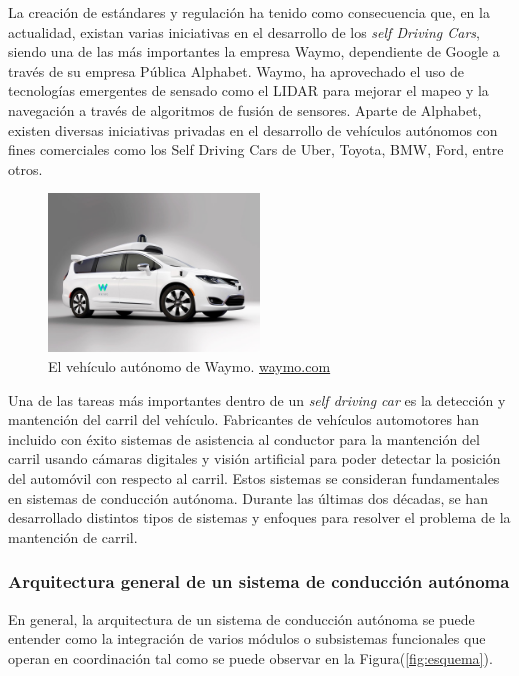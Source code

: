 La creación de estándares y regulación ha tenido como consecuencia que, en la actualidad, existan varias iniciativas 
en el desarrollo de los \textit{self Driving Cars}, siendo una de las más 
importantes la empresa Waymo, dependiente de Google a través de su empresa Pública Alphabet. Waymo, ha aprovechado 
el uso de tecnologías emergentes de sensado como el LIDAR para mejorar el mapeo y la navegación a través de algoritmos 
de fusión de sensores. Aparte de Alphabet, existen diversas iniciativas privadas en el desarrollo de vehículos autónomos 
con fines comerciales como los Self Driving Cars de Uber, Toyota, BMW, Ford, entre otros.


\begin{figure}[!h] 
\centering
\includegraphics[width=0.5\textwidth]{img/waymo}
\caption{El vehículo autónomo de Waymo. 
        \href{https://waymo.com/}{waymo.com}}
\label{fig:waymo}
\end{figure}

Una de las tareas más importantes dentro de un \textit{self driving car} es la detección y mantención del carril del 
vehículo. Fabricantes de vehículos automotores han incluido con éxito sistemas de asistencia al conductor para la 
mantención del carril usando cámaras digitales y visión artificial para poder detectar la posición del automóvil con 
respecto al carril. Estos sistemas se consideran fundamentales en sistemas de conducción autónoma. Durante las últimas 
dos décadas, se han desarrollado distintos tipos de sistemas y enfoques para resolver el problema de la mantención de 
carril.

\subsubsection{Arquitectura general de un sistema de conducción autónoma}
En general, la arquitectura de un sistema de conducción autónoma se puede entender como la integración de varios módulos o 
subsistemas funcionales que operan en coordinación tal como se puede observar en la Figura(\ref{fig:esquema}). 

